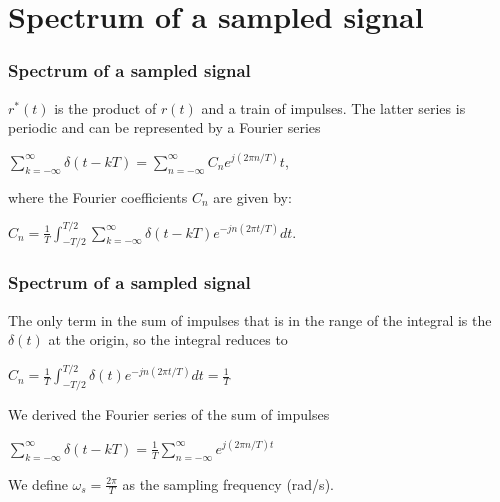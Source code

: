 \section{Spectrum of a sampled signal}

\begin{frame}
	\frametitle{Spectrum of a sampled signal}
	\vspace{-5ex}
	$r^*(t)$ is the product of $r(t)$ and a train of impulses. The latter series is periodic and can be represented by a Fourier series\\
	\begin{center}
		$\sum_{k=-\infty}^{\infty} \delta(t-kT) = \sum_{n=-\infty}^{\infty} C_ne^{j(2\pi n/T)}t$,
	\end{center}
	where the Fourier coefficients $C_n$ are given by:\\
	\begin{center}
		$C_n=\frac{1}{T}\int_{-T/2}^{T/2} \sum_{k=-\infty}^{\infty} \delta(t-kT)e^{-jn(2\pi t/T)}dt$.
	\end{center}
	
\end{frame}

\begin{frame}
	\frametitle{Spectrum of a sampled signal}
	\vspace{-10ex}
	The only term in the sum of impulses that is in the range of the integral is the $\delta(t)$ at the origin, so the integral reduces to \\
	\begin{center}
		$C_n=\frac{1}{T}\int_{-T/2}^{T/2}\delta(t)e^{-jn(2\pi t/T)}dt=\frac{1}{T}$
	\end{center}
	We derived the Fourier series of the sum of impulses\\
	\begin{center}
		$\sum_{k=-\infty}^{\infty} \delta(t-kT)=\frac{1}{T}\sum_{n=-\infty}^{\infty} e^{j(2\pi n/T)t}$
	\end{center}
	We define $\omega_s = \frac{2\pi}{T}$ as the sampling frequency (rad/s).\\
\end{frame}

